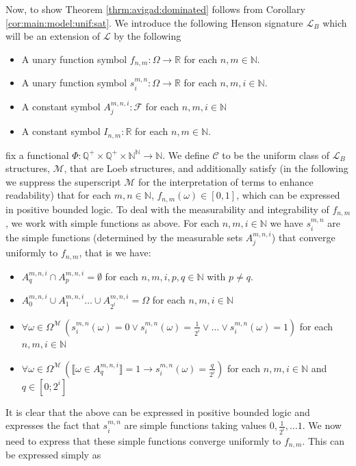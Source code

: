 \documentclass[11pt]{amsart}
\theoremstyle{definition}
\theoremstyle{remark}
\def\NN{\mathbb{N}}
\def\QQ{\mathbb{Q}}
\def\RR{\mathbb{R}}
\newcommand{\model}[1]{\llbracket {#1} \rrbracket }
\begin{document}
Now, to show Theorem \ref{thrm:avigad:dominated} follows from Corollary \ref{cor:main:model:unif:sat}. We introduce the following Henson signature $\mathcal{L}_B$ which will be an extension of $\mathcal{L}$ by the following
\begin{itemize}
      \item A unary function symbol $f_{n,m}:\Omega \to \RR$ for each $n,m \in \NN$.
    \item A unary function symbol $s^{m,n}_i:\Omega \to \RR$ for each  $n,m,i \in \NN$.
    \item A constant symbol $A^{m,n,i}_j: \mathcal{F}$ for each $n,m,i \in \NN$
     \item A constant symbol $I_{n,m}:\RR$ for each $n,m \in \NN$. 
\end{itemize}
fix a functional $\Phi:\QQ^+\times \QQ^+\times \NN^\NN\to \NN$. We define $\mathscr{C}$ to be the uniform class of $\mathcal{L}_B$ structures, $\mathcal{M}$, that are Loeb structures, and additionally satisfy (in the following we suppress the superscript $\mathcal{M}$ for the interpretation of terms to enhance readability) that for each $m,n \in \NN$, $f_{n,m}(\omega) \in [0,1]$, which can be expressed in positive bounded logic. To deal with the measurability and integrability of $f_{n,m}$, we work with simple functions as above. For each $n,m,i \in \NN$ we have $s^{m,n}_i$ are the simple functions (determined by the measurable sets $A^{m,n,i}_j$) that converge uniformly to $f_{n,m}$, that is we have:
\begin{itemize}
    \item $A^{m,n,i}_q \cap A^{m,n,i}_p = \emptyset$ for each $n,m,i,p,q \in \NN$ with $p \neq q$.
    \item $A^{m,n,i}_0 \cup A^{m,n,i}_1 \ldots \cup A^{m,n,i}_{2^{i}}= \Omega$ for each $n,m,i \in \NN$
    \item $\forall \omega \in \Omega^\mathcal{M}\,(s^{m,n}_i(\omega) = 0 \lor s^{m,n}_i(\omega)=\frac{1}{2^i} \lor \ldots \lor s^{m,n}_i(\omega) =1)$ for each $n,m,i\in \NN$
    \item $\forall \omega \in \Omega^\mathcal{M}\,(\model{\omega \in A^{m,n,i}_q} =1 \to s^{m,n}_i(\omega)=\frac{q}{2^i} )$ for each $n,m,i\in \NN$ and $q \in[0;2^i]$
\end{itemize}
It is clear that the above can be expressed in positive bounded logic and expresses the fact that $s^{m,n}_i$ are simple functions taking values $0, \frac{1}{2^i},\ldots 1$. We now need to express that these simple functions converge uniformly to $f_{n,m}$. This can be expressed simply as 
\end{document}
